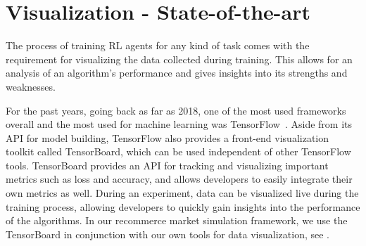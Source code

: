
\section{Visualization - State-of-the-art}

The process of training RL agents for any kind of task comes with the requirement for visualizing the data collected during training. This allows for an analysis of an algorithm's performance and gives insights into its strengths and weaknesses.

For the past years, going back as far as 2018, one of the most used frameworks overall and the most used for machine learning was TensorFlow~\cite{StackOverflowSurvey}. Aside from its API for model building, TensorFlow also provides a front-end visualization toolkit called TensorBoard, which can be used independent of other TensorFlow tools. TensorBoard provides an API for tracking and visualizing important metrics such as loss and accuracy, and allows developers to easily integrate their own metrics as well. During an experiment, data can be visualized live during the training process, allowing developers to quickly gain insights into the performance of the algorithms. In our recommerce market simulation framework, we use the TensorBoard in conjunction with our own tools for data visualization, see .

